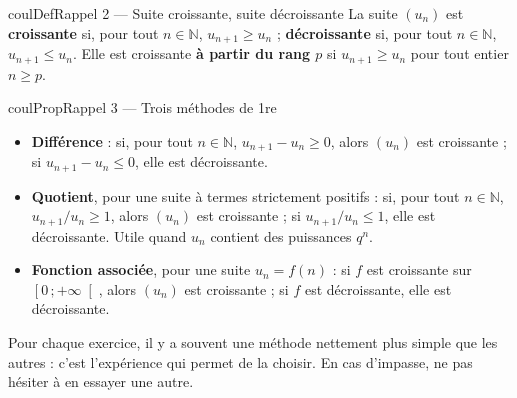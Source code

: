 \documentclass[11pt,a4paper]{article}
\makeatletter
\newcommand{\N}{\mathbb{N}}
\newcommand{\lycee@intfo}[2]{\left[#1\,;#2\right[}
\providecommand{\intfo}{\lycee@intfo}%
\newcounter{lycee@signet}
\newcommand{\signet}[3][]{\stepcounter{lycee@signet}%
  \edef\lycee@dest{\if\relax\detokenize{#1}\relax
    signet.\arabic{lycee@signet}\else#1\fi}%
  \hypertarget{\lycee@dest}{}\bookmark[level=#2,dest=\lycee@dest]{#3}}
\def\textsuperscript#1{#1}\def\dfrac#1#2{#1/#2}\def\frac#1#2{#1/#2}%
\newenvironment{definitionbox}[1][Définition]%
  {\begin{boitecours}[phantom={\signet{2}{#1}}]{coulDef}{#1}}{\end{boitecours}}
\newenvironment{proprietebox}[1][Propriété]%
  {\begin{boitecours}[phantom={\signet{2}{#1}}]{coulProp}{#1}}{\end{boitecours}}
\makeatother
\begin{document}
\begin{definitionbox}[Rappel 2 --- Suite croissante, suite décroissante]
La suite $(u_{n})$ est \textbf{croissante} si, pour tout $n\in\N$,
$u_{n+1}\geq u_{n}$ ; \textbf{décroissante} si, pour tout $n\in\N$,
$u_{n+1}\leq u_{n}$. Elle est croissante \textbf{à partir du rang $p$} si
$u_{n+1}\geq u_{n}$ pour tout entier $n\geq p$.
\end{definitionbox}

\begin{proprietebox}[Rappel 3 --- Trois méthodes de 1\textsuperscript{re}]
\begin{itemize}
  \item \textbf{Différence} : si, pour tout $n\in\N$, $u_{n+1}-u_{n}\geq 0$,
        alors $(u_{n})$ est croissante ; si $u_{n+1}-u_{n}\leq 0$, elle est décroissante.
  \item \textbf{Quotient}, pour une suite à termes strictement positifs : si, pour tout $n\in\N$, $\frac{u_{n+1}}{u_{n}}\geq 1$, alors $(u_{n})$ est croissante ;
        si $\frac{u_{n+1}}{u_{n}}\leq 1$, elle est décroissante. Utile quand $u_{n}$
        contient des puissances $q^{n}$.
  \item \textbf{Fonction associée}, pour une suite $u_{n}=f(n)$ : si $f$ est croissante
        sur $\intfo{0}{+\infty}$, alors $(u_{n})$ est croissante ; si $f$ est
        décroissante, elle est décroissante.
\end{itemize}
Pour chaque exercice, il y a souvent une méthode nettement plus simple que les autres :
c'est l'expérience qui permet de la choisir. En cas d'impasse, ne pas hésiter à en essayer
une autre.
\end{proprietebox}
\end{document}
